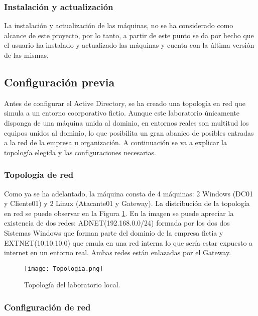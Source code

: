 \subsubsection{Instalación y actualización}

La instalación y actualización de las máquinas, no se ha considerado como alcance de este proyecto, por lo tanto, a partir de este punto se da por hecho que el usuario ha instalado y actualizado las máquinas y cuenta con la última versión de las mismas. 

\subsection{Configuración previa}

Antes de configurar el Active Directory, se ha creado una topología en red que simula a un entorno coorporativo fictio. Aunque este laboratorio únicamente disponga de una máquina unida al dominio, en entornos reales son multitud los equipos unidos al dominio, lo que posibilita un gran abanico de posibles entradas a la red de la empresa u organización. A continuación se va a explicar la topología elegida y las configuraciones necesarias.

\subsubsection{Topología de red}

Como ya se ha adelantado, la máquina consta de 4 máquinas: 2 Windows (DC01 y Cliente01) y 2 Linux (Atacante01 y Gateway). La distribución de la topología en red se puede observar en la Figura \ref{Topología}. En la imagen se puede apreciar la existencia de dos redes: ADNET(192.168.0.0/24) formada por los dos dos Sistemas Windows que forman parte del dominio de la empresa fictia y EXTNET(10.10.10.0) que emula en una red interna lo que sería estar expuesto a internet en un entorno real. Ambas redes están enlazadas por el Gateway. 

\begin{figure}[H] %
\begin{center}
\texttt{[image: Topologia.png]}
\end{center}
\caption{Topología del laboratorio local.}
\label{Topología}
\end{figure}

\subsubsection{Configuración de red}

